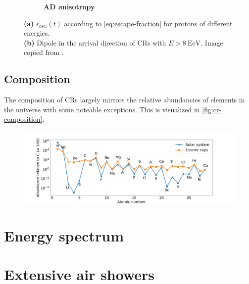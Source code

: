 \begin{figure}[H]
\begin{subfigure}[b]{0.68\textwidth}
		\caption{\textbf{AD anisotropy}}
		\label{fig:ad-anisotropy}
	\end{subfigure}
	\caption{\textbf{(a)} $r_\text{esc.}(t)$ according to \autoref{eq:escape-fraction} for protons of different energies.\\ \textbf{(b)} Dipole in the arrival
	direction of CRs with $E>\SI{8}{\exa\electronvolt}$. Image copied from \cite{pierre2017observation}.}
\end{figure}

\subsection{Composition}
\label{ssec:cr-composition}

The composition of CRs largely mirrors the relative abundancies of elements in the universe with some noteable exceptions. This is visualized in 
\autoref{fig:cr-composition}.

\begin{figure}
	\centering
	\includegraphics[width=1\textwidth]{./plots/cosmic_ray_composition.png}
	\caption{}
	\label{fig:cr-composition}
\end{figure}

\section{Energy spectrum}
\label{sec:cr-energy-spectrum}



\section{Extensive air showers}
\label{sec:extensive-air-showers}